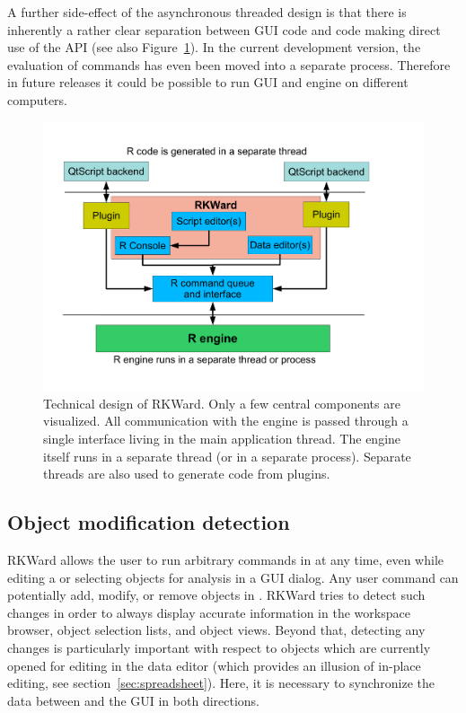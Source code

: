 A further side-effect of the asynchronous threaded design is that there is
inherently a rather clear separation between GUI code and code making direct use
of the  API (see also Figure~\ref{fig:design_sketch}). In the current development version, the evaluation
of  commands has even been moved into a separate process. Therefore in future releases it could 
be possible to run GUI and  engine on different computers.

\begin{figure}[htp]
 \centering
 \includegraphics{../figures/design_sketch.pdf}
 \caption{Technical design of RKWard. Only a few central components are visualized.
 All communication with the  engine is passed through a single interface living in the main application thread. The  engine itself
 runs in a separate thread (or in a separate process). 
 Separate threads are also used to generate  code from plugins.
}
 \label{fig:design_sketch}
\end{figure}

\subsection{Object modification detection}
\label{sec:technical_omd}
RKWard allows the user to run arbitrary commands in  at any time, even while
editing a  or selecting objects for analysis in a GUI dialog. Any user
command can potentially add, modify, or remove objects in . RKWard tries to
detect such changes in order to always display accurate information in the
workspace browser, object selection lists, and object views. Beyond that,
detecting any changes is particularly important with respect to objects which
are currently opened for editing in the data editor (which provides an illusion
of in-place editing, see section~\ref{sec:spreadsheet}). Here, it is necessary to synchronize
the data between  and the GUI in both directions.

